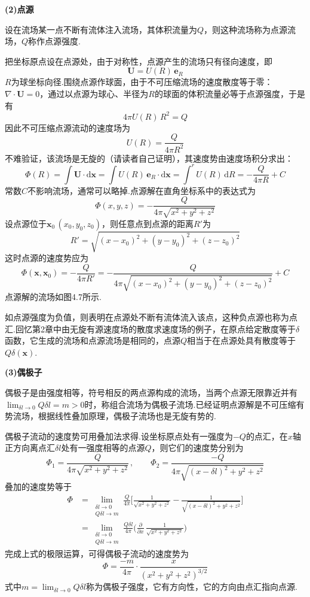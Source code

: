 \textbf{(2)点源}

设在流场某一点不断有流体注入流场，其体积流量为$Q$，则这种流场称为点源流场，$Q$称作点源强度.

把坐标原点设在点源处，由于对称性，点源产生的流场只有径向速度，即
\[
\boldsymbol{U}=U(R)\,\boldsymbol{e}_R
\]
$R$为球坐标向径.围绕点源作球面，由于不可压缩流场的速度散度等于零：$\nabla\cdot\boldsymbol{U}=0$，通过以点源为球心、半径为$R$的球面的体积流量必等于点源强度，于是有
\[
4\pi U(R)\,R^{2}=Q
\]
因此不可压缩点源流动的速度场为
\[
U(R)=\frac{Q}{4\pi R^{2}}
\]
不难验证，该流场是无旋的（请读者自己证明），其速度势由速度场积分求出：
\begin{equation*}
\Phi(R)=\int\boldsymbol{U}\cdot\mathrm{d}\boldsymbol{x}=\int U(R)\,\boldsymbol{e}_R\cdot\mathrm{d}\boldsymbol{x}=\int^r U(R)\,\mathrm{d}R=-\frac{Q}{4\pi R}+C
\tag{4.40}
\end{equation*}
常数$C$不影响流场，通常可以略掉.点源解在直角坐标系中的表达式为
\[
\Phi(x,y,z)=-\frac{Q}{4\pi\sqrt{x^{2}+y^{2}+z^{2}}}
\]
设点源位于$\boldsymbol{x}_0\,(x_0,y_0,z_0)$，则任意点到点源的距离$R'$为
\[
R'=\sqrt{(x-x_0)^{2}+(y-y_0)^{2}+(z-z_0)^{2}}
\]
这时点源的速度势应为
\[
\Phi(\boldsymbol{x},\boldsymbol{x}_0)=-\frac{Q}{4\pi R'}=-\frac{Q}{4\pi\sqrt{(x-x_0)^{2}+(y-y_0)^{2}+(z-z_0)^{2}}}+C
\]
点源解的流场如图4.7所示.

如点源强度为负值，则表明在点源处不断有流体流入该点，这种负点源也称为点汇.回忆第2章中由无旋有源速度场的散度求速度场的例子，在原点给定散度等于$\delta$函数，它生成的流场和点源流场是相同的，点源$Q$相当于在点源处具有散度等于$Q\delta(\boldsymbol{x})$.

\textbf{(3)偶极子}

偶极子是由强度相等，符号相反的两点源构成的流场，当两个点源无限靠近并有$\displaystyle\lim_{\delta l\to 0}Q\delta l=m>0$时，称组合流场为偶极子流场.已经证明点源解是不可压缩有势流场，根据线性叠加原理，偶极子流场也是无旋有势的.

偶极子流动的速度势可用叠加法求得.设坐标原点处有一强度为$-Q$的点汇，在$x$轴正方向离点汇$\delta l$处有一强度相等的点源$Q$，则它们的速度势分别为
\[
\Phi_1=\frac{Q}{4\pi\sqrt{x^{2}+y^{2}+z^{2}}}\,,\qquad \Phi_2=\frac{-Q}{4\pi\sqrt{(x-\delta l)^{2}+y^{2}+z^{2}}}
\]
叠加的速度势等于
\begin{align*}
\Phi&=\lim_{\substack{\delta l\to 0\\ Q\delta l\to m}}\frac{Q}{4\pi}\bigg[\frac{1}{\sqrt{x^{2}+y^{2}+z^{2}}}-\frac{1}{\sqrt{(x-\delta l)^{2}+y^{2}+z^{2}}}\bigg]\\
&=\lim_{\substack{\delta l\to 0\\ Q\delta l\to m}}\frac{Q\delta l}{4\pi}\bigg(\frac{\partial}{\partial x}\,\frac{1}{\sqrt{x^{2}+y^{2}+z^{2}}}\bigg)
\end{align*}
完成上式的极限运算，可得偶极子流动的速度势为
\begin{equation*}
\Phi=\frac{-m}{4\pi}\cdot\frac{x}{(x^{2}+y^{2}+z^{2})^{3/2}}
\tag{4.41a}
\end{equation*}
式中$m=\displaystyle\lim_{\delta l\to 0}Q\delta l$称为偶极子强度，它有方向性，它的方向由点汇指向点源.

